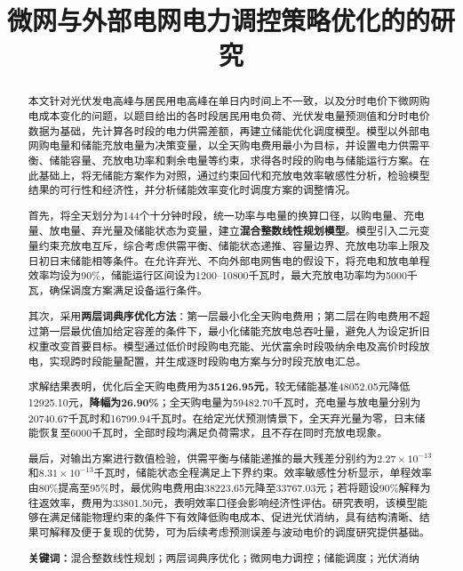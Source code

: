 \documentclass[UTF8,a4paper,12pt,fontset=fandol]{ctexart}
\title{\heiti\bfseries 微网与外部电网电力调控策略优化的的研究}
\author{}
\date{}
\numberwithin{equation}{section}
\begin{document}
\maketitle
\vspace{-2.2em}

\begingroup
\small
{}
\begin{abstract}
本文针对光伏发电高峰与居民用电高峰在单日内时间上不一致，以及分时电价下微网购电成本变化的问题，以题目给出的各时段居民用电负荷、光伏发电量预测值和分时电价数据为基础，先计算各时段的电力供需差额，再建立储能优化调度模型。模型以外部电网购电量和储能充放电量为决策变量，以全天购电费用最小为目标，并设置电力供需平衡、储能容量、充放电功率和剩余电量等约束，求得各时段的购电与储能运行方案。在此基础上，将无储能方案作为对照，通过约束回代和充放电效率敏感性分析，检验模型结果的可行性和经济性，并分析储能效率变化时调度方案的调整情况。

首先，将全天划分为144个十分钟时段，统一功率与电量的换算口径，以购电量、充电量、放电量、弃光量及储能状态为变量，建立\textbf{混合整数线性规划模型}。模型引入二元变量约束充放电互斥，综合考虑供需平衡、储能状态递推、容量边界、充放电功率上限及日初日末储能相等条件。在允许弃光、不向外部电网售电的假设下，将充电和放电单程效率均设为90\%，储能运行区间设为1200--10800千瓦时，最大充放电功率均为5000千瓦，确保调度方案满足设备运行条件。

其次，采用\textbf{两层词典序优化方法}：第一层最小化全天购电费用；第二层在购电费用不超过第一层最优值加给定容差的条件下，最小化储能充放电总吞吐量，避免人为设定折旧权重改变首要目标。模型通过低价时段购电充能、光伏富余时段吸纳余电及高价时段放电，实现跨时段能量配置，并生成逐时段购电方案与分时段充放电汇总。

求解结果表明，优化后全天购电费用为\textbf{35126.95元}，较无储能基准48052.05元降低12925.10元，\textbf{降幅为26.90\%}；全天购电量为59482.70千瓦时，充电量与放电量分别为20740.67千瓦时和16799.94千瓦时。在给定光伏预测情景下，全天弃光量为零，日末储能恢复至6000千瓦时，全部时段均满足负荷需求，且不存在同时充放电现象。

最后，对输出方案进行数值检验，供需平衡与储能递推的最大残差分别约为$2.27\times10^{-13}$和$8.31\times10^{-13}$千瓦时，储能状态全程满足上下界约束。效率敏感性分析显示，单程效率由80\%提高至95\%时，最优购电费用由38223.65元降至33767.03元；若将题设90\%解释为往返效率，费用为33801.50元，表明效率口径会影响经济性评估。研究表明，该模型能够在满足储能物理约束的条件下有效降低购电成本、促进光伏消纳，具有结构清晰、结果可解释及便于复现的优势，可为后续考虑预测误差与波动电价的调度研究提供基础。

\par\medskip
\noindent\textbf{关键词：}混合整数线性规划；两层词典序优化；微网电力调控；储能调度；光伏消纳
\end{abstract}
\endgroup
\clearpage
\end{document}

